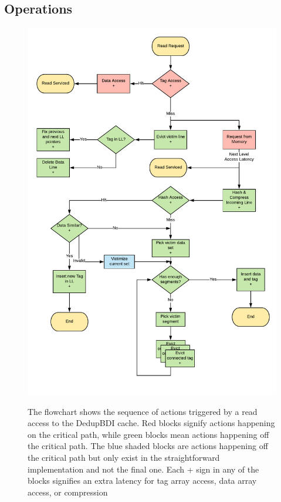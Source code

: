 \subsection{Operations}
\label{ssec:DedupBDIOperations}
\begin{figure}
    \includegraphics[width=\textwidth]{DedupBDI_Read.pdf}
    \label{fig:DeduoBDI_Read}
    \caption[DedupBDI Read]{The flowchart shows the sequence of actions triggered by a read access to the DedupBDI cache. Red blocks signify actions happening on the critical path, while green blocks mean actions happening off the critical path. The blue shaded blocks are actions happening off the critical path but only exist in the straightforward implementation and not the final one. Each + sign in any of the blocks signifies an extra latency for tag array access, data array access, or compression}
\end{figure}
